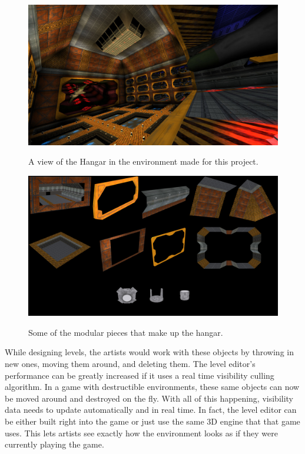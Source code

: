 \documentclass[12pt]{ucthesis}
\newcommand{\captionfonts}{\small\bf\ssp}
\begin{document}
\begin{figure}
\begin{center}
\includegraphics[width=\textwidth]{Images/Hangar.jpg}
\captionfonts
\caption[Hangar]{A view of the Hangar in the environment made for this project.}
\label{fig:hangar-view}
\includegraphics[width=\textwidth]{Images/Peices.jpg}
\captionfonts
\caption[Hangar Modular Pieces]{Some of the modular pieces that make up the hangar.}
\label{fig:hangar-peices}
\end{center}
\end{figure}
While designing levels, the artists would work with these objects by throwing in new ones, moving them around, and deleting them.
The level editor's performance can be greatly increased if it uses a real time visibility culling  algorithm.
In a game with destructible environments, these same objects can now be moved around and destroyed on the fly.
With all of this happening, visibility data needs to update automatically and in real time.
In fact, the level editor can be either built right into the game or just use the same 3D engine that that game uses.
This lets artists see exactly how the environment looks as if they were currently playing the game.
\end{document}
